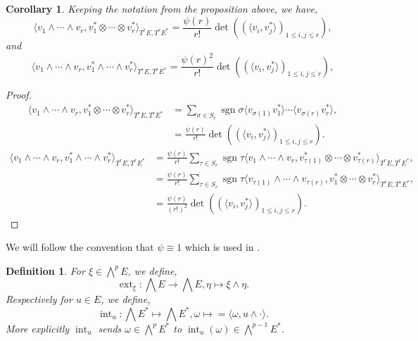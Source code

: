 \documentclass[10pt]{article}
\newtheorem{definition}{Definition}[section]
\newtheorem{corollary}{Corollary} [section]
\DeclareMathOperator{\sgn}{sgn}
\DeclareMathOperator{\ext}{ext}
\DeclareMathOperator{\inte}{int}
\begin{document}
\begin{corollary}
  Keeping the notation from the proposition above, we have,
  \begin{equation*}
    \langle v_1\wedge\cdots\wedge v_r,v_1^*\otimes \cdots\otimes v_r^*\rangle_{T^rE,T^rE^*} = {\frac {\psi(r)} {r!}}\det((\langle v_i,v_j^*\rangle)_{1\leq i,j\leq r}),
  \end{equation*}
  and 
  \begin{equation*}
    \langle v_1\wedge\cdots\wedge v_r,v_1^*\wedge \cdots\wedge v_r^*\rangle_{T^rE,T^rE^*} = {\frac {\psi(r)^2} {r!}}\det((\langle v_i,v_j^*\rangle)_{1\leq i,j\leq r}),
  \end{equation*}
\end{corollary}

\begin{proof}
  \begin{align*}
    \langle v_1\wedge\cdots\wedge v_r,v_1^*\otimes \cdots\otimes v_r^*\rangle_{T^rE,T^rE^*} & = \sum_{\sigma\in S_r}\sgn\sigma \langle v_{\sigma(1)}v^*_1\rangle\cdots\langle v_{\sigma(r)}v^*_r\rangle,\\
    & = {\frac {\psi(r)} {r!}}\det((\langle v_i,v_j^*\rangle)_{1\leq i,j\leq r}).
  \end{align*}
  \begin{align*}
    \langle v_1\wedge\cdots\wedge v_r,v_1^*\wedge \cdots\wedge v_r^*\rangle_{T^rE,T^rE^*} & = {\frac {\psi(r)} {r!}}\sum_{\tau\in S_r}\sgn\tau\langle v_1\wedge\cdots\wedge v_r,v_{\tau(1)}^*\otimes \cdots\otimes v_{\tau(r)}^*\rangle_{T^rE,T^rE^*},\\
    &  = {\frac {\psi(r)} {r!}}\sum_{\tau\in S_r}\sgn\tau \langle v_{\tau(1)}\wedge\cdots\wedge v_{\tau(r)},v_1^*\otimes \cdots\otimes v_r^*\rangle_{T^rE,T^rE^*},\\
    & = {\frac {\psi(r)} {(r!)^2}}\det((\langle v_i,v_j^*\rangle)_{1\leq i,j\leq r}).
  \end{align*}
\end{proof}

We will follow the convention that $\psi\equiv 1$ which is used in \cite{Kobayashi-Nomizu}.

\begin{definition}
  For $\xi\in\bigwedge^pE$, we define,
  \begin{equation*}
    \ext_\xi:\bigwedge E \to\bigwedge E, \eta\mapsto \xi\wedge\eta.
  \end{equation*}
  Respectively for $u\in E$, we define,
  \begin{equation*}
  \inte_u:\bigwedge E^*\mapsto \bigwedge E^*, \omega\mapsto  = \langle \omega,u\wedge \cdot\rangle.%
  \end{equation*}
  More explicitly $\inte_u$ sends $\omega\in \bigwedge^pE^*$ to $\inte_u(\omega)\in\bigwedge^{p-1}E^*$.
\end{definition}
\end{document}
